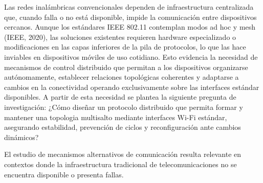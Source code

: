 
Las redes inalámbricas convencionales dependen de infraestructura centralizada que, cuando falla o no está disponible, impide la comunicación entre dispositivos cercanos. Aunque los estándares IEEE 802.11 contemplan modos ad hoc y mesh (IEEE, 2020), las soluciones existentes requieren hardware especializado o modificaciones en las capas inferiores de la pila de protocolos, lo que las hace inviables en dispositivos móviles de uso cotidiano. Esto evidencia la necesidad de mecanismos de control distribuido que permitan a los dispositivos organizarse autónomamente, establecer relaciones topológicas coherentes y adaptarse a cambios en la conectividad operando exclusivamente sobre las interfaces estándar disponibles. A partir de esta necesidad se plantea la siguiente pregunta de investigación: ¿Cómo diseñar un protocolo distribuido que permita formar y mantener una topologia multisalto mediante interfaces Wi-Fi estándar, asegurando estabilidad, prevención de ciclos y reconfiguración ante cambios dinámicos?

\newpage
{}

El estudio de mecanismos alternativos de comunicación resulta relevante en contextos donde la infraestructura tradicional de telecomunicaciones no se encuentra disponible o presenta fallas.

